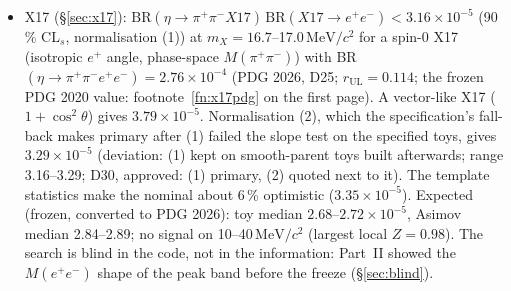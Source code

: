 \documentclass[11pt,a4paper]{article}
\newcommand{\ee}{\ensuremath{e^{+}e^{-}}\xspace}
\newcommand{\pipi}{\ensuremath{\pi^{+}\pi^{-}}\xspace}
\newcommand{\ppee}{\ensuremath{\pi^{+}\pi^{-}e^{+}e^{-}}\xspace}
\newcommand{\Mee}{\ensuremath{M(e^{+}e^{-})}\xspace}
\newcommand{\Mpipi}{\ensuremath{M(\pi^{+}\pi^{-})}\xspace}
\newcommand{\MeVcc}{\ensuremath{\mathrm{MeV}/c^{2}}\xspace}
\newcommand{\BRX}{\ensuremath{\mathrm{BR}(\eta\to\pipi X17)\,\mathrm{BR}(X17\to\ee)}\xspace}
\begin{document}
{\begin{itemize}
      at 3.5\,GeV ($1.14\pm0.20$ / $0.93\pm0.14$\,mb); with the one-sided items 0.48\,mb, with the direct-decay route 0.58--0.59\,mb (0.70\,mb with
      its per-class side-band value; 0.85\,mb with the $p_T$ item too); no significance while the composition is unresolved (D31, ruled: the composition from the data,
      provisionally; D32, the lead analysis's reading, close \ee pairs lost in the data, to be tested in a separate analysis).
\item X17 (\S\ref{sec:x17}): $\BRX < 3.16\times10^{-5}$ (90\,\% CL$_s$, normalisation (1)) at $m_X=16.7$--17.0\,\MeVcc for a spin-0 X17
      (isotropic $e^+$ angle, phase-space \Mpipi) with BR$(\eta\to\ppee)=2.76\times10^{-4}$ (PDG 2026, D25; $r_{\mathrm{UL}}=0.114$; the frozen
      PDG 2020 value: footnote~\ref{fn:x17pdg} on the first page). A vector-like X17 ($1+\cos^2\theta$) gives $3.79\times10^{-5}$. Normalisation (2), which the
      specification's fall-back makes primary after (1) failed the slope test on the specified toys, gives $3.29\times10^{-5}$ (deviation:
      (1) kept on smooth-parent toys built afterwards; range 3.16--3.29; D30, approved: (1) primary, (2) quoted next to it). The template statistics make the nominal about
      6\,\% optimistic ($3.35\times10^{-5}$). Expected (frozen, converted to PDG 2026): toy median $2.68$--$2.72\times10^{-5}$, Asimov median 2.84--2.89; no signal on 10--40\,\MeVcc
      (largest local $Z=0.98$). The search is blind in the code, not in the information: Part~II showed the \Mee shape of the peak band
      before the freeze (\S\ref{sec:blind}).
\end{itemize}}
\end{document}
